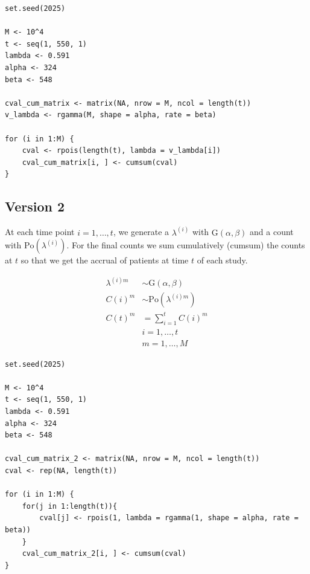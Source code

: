 \begin{knitrout}
\color{fgcolor}\begin{kframe}
\begin{verbatim}
set.seed(2025)

M <- 10^4
t <- seq(1, 550, 1)
lambda <- 0.591
alpha <- 324
beta <- 548

cval_cum_matrix <- matrix(NA, nrow = M, ncol = length(t))
v_lambda <- rgamma(M, shape = alpha, rate = beta)

for (i in 1:M) {
	cval <- rpois(length(t), lambda = v_lambda[i])
	cval_cum_matrix[i, ] <- cumsum(cval)
}
\end{verbatim}
\end{kframe}
\end{knitrout}

\subsection{Version 2}

At each time point $i=1,\ldots, t$, we generate a $\lambda^{(i)}$ with $\textrm{G}(\alpha, \beta)$ and a count with $\textrm{Po}(\lambda^{(i)})$. For the final counts we sum cumulatively (cumsum) the counts at $t$ so that we get the accrual of patients at time $t$ of each study.

\begin{align*}
\lambda^{(i)m} &\sim \textrm{G}(\alpha, \beta) \\
C (i)^m&\sim \textrm{Po} (\lambda^{(i)m})\\
C(t)^m &= \sum_{i=1}^tC(i)^m \\
& i = 1, \ldots, t \\
& m = 1, \ldots, M 
\end{align*}



\begin{knitrout}
\color{fgcolor}\begin{kframe}
\begin{verbatim}
set.seed(2025)

M <- 10^4
t <- seq(1, 550, 1)
lambda <- 0.591
alpha <- 324
beta <- 548

cval_cum_matrix_2 <- matrix(NA, nrow = M, ncol = length(t))
cval <- rep(NA, length(t))

for (i in 1:M) {
	for(j in 1:length(t)){
		cval[j] <- rpois(1, lambda = rgamma(1, shape = alpha, rate = beta))
	}
	cval_cum_matrix_2[i, ] <- cumsum(cval)
}
\end{verbatim}
\end{kframe}
\end{knitrout}


